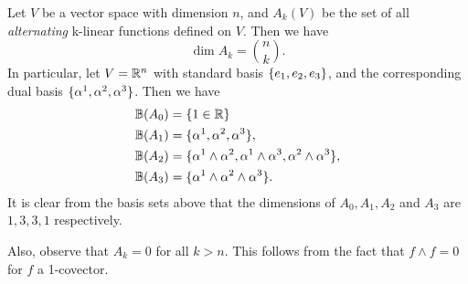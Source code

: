 \begin{summary}
	Let $ V $ be a vector space with dimension $ n $, and $ A_k(V) $ be the set of all \textit{alternating} k-linear functions defined on $ V $. Then we have
	\[ \dim A_k = \binom{n}{k}. \]
	In particular, let $ V = \mathbb{R}^n $ with standard basis $ \{e_1,e_2,e_3\} $, and the corresponding dual basis $ \{\alpha^1,\alpha^2,\alpha^3\} $. Then we have
	\begin{align*}
		\mathbb{B}(A_0) &= \{1 \in \mathbb{R}\}\\
		\mathbb{B}(A_1) &= \{\alpha^1,\alpha^2,\alpha^3\},\\
		\mathbb{B}(A_2) &= \{\alpha^1 \wedge \alpha^2, \alpha^1 \wedge \alpha^3, \alpha^2 \wedge \alpha^3\},\\
		\mathbb{B}(A_3) &= \{\alpha^1 \wedge \alpha^2 \wedge \alpha^3\}.
	\end{align*}
	It is clear from the basis sets above that the dimensions of $ A_0,A_1,A_2 $ and $ A_3 $ are $ 1,3,3,1 $ respectively.
	
	Also, observe that $ A_k = 0 $ for all $ k > n $. This follows from the fact that $ f\wedge f = 0 $ for $ f $ a 1-covector.
\end{summary}

